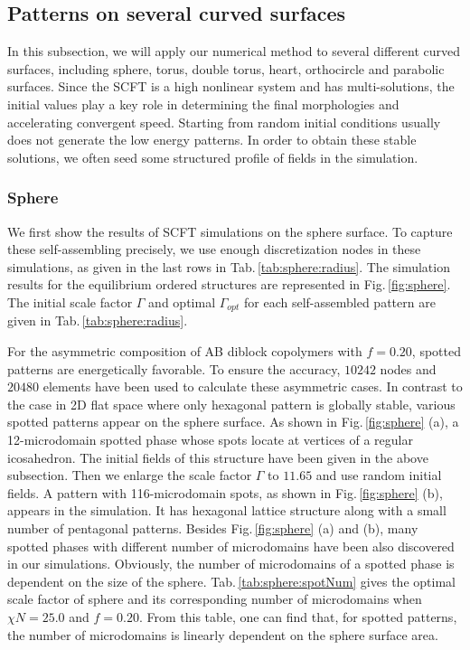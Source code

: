 \documentclass[final,1p,times]{elsarticle}
\begin{document}
\subsection{Patterns on several curved surfaces}
\label{subsec:pattern}

In this subsection, we will apply our numerical method to several different
curved surfaces, including sphere, torus, double torus, heart, orthocircle
and parabolic surfaces.  Since the SCFT is a high nonlinear system and has
multi-solutions, the initial values play a key role in determining the final
morphologies and accelerating convergent speed.  Starting from random initial
conditions usually does not generate the low energy patterns. In order to
obtain these stable solutions, we often seed some structured profile of
fields in the simulation.

\subsubsection{Sphere}
\label{subsubsec:sphere}

We first show the results of SCFT simulations on the sphere surface.  To capture
these self-assembling precisely, we use enough discretization nodes in these
simulations, as given in the last rows in Tab.\,\ref{tab:sphere:radius}.  The
simulation results for the equilibrium ordered structures are represented in
Fig.\,\ref{fig:sphere}.  The initial scale factor $\Gamma$ and optimal 
$\Gamma_{opt}$ for each self-assembled pattern are given in
Tab.\,\ref{tab:sphere:radius}.  

For the asymmetric composition of AB diblock copolymers with $f=0.20$, spotted
patterns are energetically favorable.  To ensure the accuracy, $10242$ nodes
and $20480$ elements have been used to calculate these asymmetric cases.  In
contrast to the case in 2D flat space where only hexagonal pattern is globally
stable, various spotted patterns appear on the sphere surface. As shown in
Fig.\,\ref{fig:sphere} (a), a 12-microdomain spotted phase whose spots locate
at vertices of a regular icosahedron. The initial fields of this structure have
been given in the above subsection.  Then we enlarge the scale factor $\Gamma$
to $11.65$ and use random initial fields.  A pattern with 116-microdomain
spots, as shown in Fig.\,\ref{fig:sphere} (b), appears in the simulation.  It
has hexagonal lattice structure along with a small number of pentagonal
patterns.  Besides Fig.\,\ref{fig:sphere} (a) and (b), many spotted phases with
different number of microdomains have been also discovered in our
simulations. Obviously, the number of microdomains of a spotted phase is
dependent on the size of the sphere.  Tab.\,\ref{tab:sphere:spotNum} gives the
optimal scale factor of sphere and its corresponding number of microdomains
when $\chi N=25.0$ and $f=0.20$. From this table, one can find that, for
spotted patterns, the number of microdomains is linearly dependent on the
sphere surface area.
\end{document}
